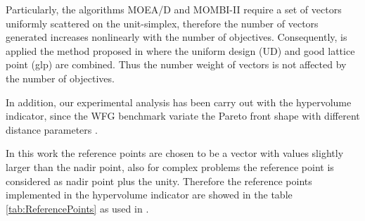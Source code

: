 
Particularly, the algorithms MOEA/D and MOMBI-II require a set of vectors uniformly scattered on the unit-simplex, therefore the number of vectors generated increases nonlinearly with the number of objectives.
%
Consequently, is applied the method proposed in \cite{Joel:MOEAD_Uniform_Design, Joel:Kuhn_Munkres} where the uniform design (UD) \cite{Joel:Uniform_Design} and good lattice point (glp) are combined.
%
Thus the number weight of vectors is not affected by the number of objectives.

In addition, our experimental analysis has been carry out with the hypervolume indicator, since the WFG benchmark variate the Pareto front shape with different distance parameters \cite{Joel:ScalabilityStudy}.
%

In this work the reference points are chosen to be a vector with values slightly larger than the nadir point, also for complex problems the reference point is considered as nadir point plus the unity.
%
Therefore the reference points implemented in the hypervolume indicator are showed in the table \ref{tab:ReferencePoints} as used in \cite{Joel:Kuhn_Munkres, Joel:OperatorAHX}.


